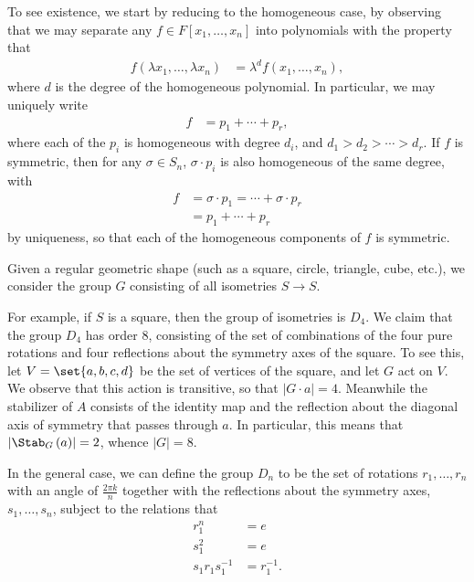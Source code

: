 \documentclass[10pt]{mypackage}
\begin{document}
\begin{example}
  To see existence, we start by reducing to the homogeneous case, by observing that we may separate any $f\in F\left[ x_1,\dots,x_n \right]$ into polynomials with the property that
  \begin{align*}
    f\left( \lambda x_1,\dots,\lambda x_n \right) &= \lambda^{d}f\left( x_1,\dots,x_n \right),
  \end{align*}
  where $d$ is the degree of the homogeneous polynomial. In particular, we may uniquely write
  \begin{align*}
    f &= p_1 + \cdots + p_r,
  \end{align*}
  where each of the $p_i$ is homogeneous with degree $d_i$, and $d_1 > d_2 > \cdots > d_r$. If $f$ is symmetric, then for any $\sigma\in S_n$, $\sigma\cdot p_i$ is also homogeneous of the same degree, with
  \begin{align*}
    f &= \sigma\cdot p_1 = \cdots + \sigma\cdot p_r\\
      &= p_1 + \cdots + p_r
  \end{align*}
  by uniqueness, so that each of the homogeneous components of $f$ is symmetric.
\end{example}
\begin{example}
  Given a regular geometric shape (such as a square, circle, triangle, cube, etc.), we consider the group $G$ consisting of all isometries $S\rightarrow S$.%

  For example, if $S$ is a square, then the group of isometries is $D_4$. We claim that the group $D_4$ has order $8$, consisting of the set of combinations of the four pure rotations and four reflections about the symmetry axes of the square. To see this, let $V = \set{a,b,c,d}$ be the set of vertices of the square, and let $G$ act on $V$. We observe that this action is transitive, so that $\left\vert G\cdot a \right\vert = 4$. Meanwhile the stabilizer of $A$ consists of the identity map and the reflection about the diagonal axis of symmetry that passes through $a$. In particular, this means that $\left\vert \Stab_G\left( a \right) \right\vert = 2$, whence $\left\vert G \right\vert = 8$.%

  In the general case, we can define the group $D_n$ to be the set of rotations $r_1,\dots,r_n$ with an angle of $\frac{2\pi k}{n}$ together with the reflections about the symmetry axes, $s_1,\dots,s_n$, subject to the relations that
  \begin{align*}
    r_1^{n} &= e\\
    s_1^2 &= e\\
    s_1r_1s_1^{-1} &= r_1^{-1}.
  \end{align*}
\end{example}
\end{document}
